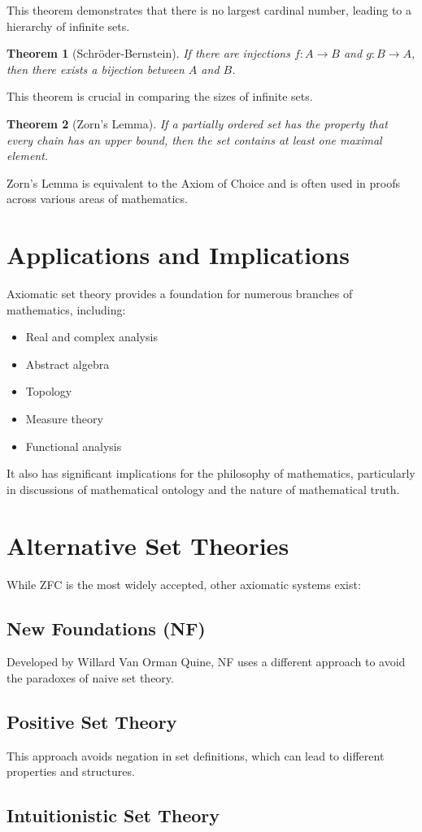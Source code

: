 \documentclass[12pt,a4paper]{article}
\newtheorem{theorem}{Theorem}
\newcommand{\sectiontitle}[1]{\section{\textcolor{draculaPurple}{#1}}}
\newcommand{\subsectiontitle}[1]{\subsection{\textcolor{draculaPink}{#1}}}
\begin{document}
This theorem demonstrates that there is no largest cardinal number, leading to a hierarchy of infinite sets.

\begin{theorem}[Schröder-Bernstein]
If there are injections $f: A \rightarrow B$ and $g: B \rightarrow A$, then there exists a bijection between $A$ and $B$.
\end{theorem}

This theorem is crucial in comparing the sizes of infinite sets.

\begin{theorem}[Zorn's Lemma]
If a partially ordered set has the property that every chain has an upper bound, then the set contains at least one maximal element.
\end{theorem}

Zorn's Lemma is equivalent to the Axiom of Choice and is often used in proofs across various areas of mathematics.

\sectiontitle{Applications and Implications}

Axiomatic set theory provides a foundation for numerous branches of mathematics, including:

\begin{itemize}
    \item Real and complex analysis
    \item Abstract algebra
    \item Topology
    \item Measure theory
    \item Functional analysis
\end{itemize}

It also has significant implications for the philosophy of mathematics, particularly in discussions of mathematical ontology and the nature of mathematical truth.

\sectiontitle{Alternative Set Theories}

While ZFC is the most widely accepted, other axiomatic systems exist:

\subsectiontitle{New Foundations (NF)}

Developed by Willard Van Orman Quine, NF uses a different approach to avoid the paradoxes of naive set theory.

\subsectiontitle{Positive Set Theory}

This approach avoids negation in set definitions, which can lead to different properties and structures.

\subsectiontitle{Intuitionistic Set Theory}
\end{document}
